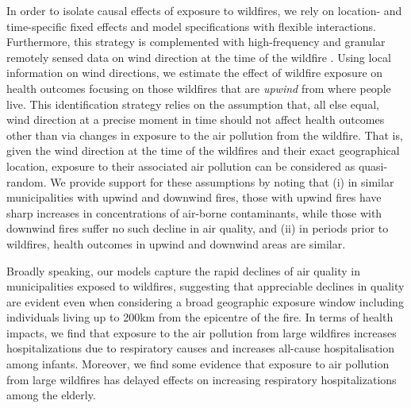 \documentclass[11pt]{article}
\begin{document}
\begin{spacing}{1.5}
In order to isolate causal effects of exposure to wildfires, we rely on location- and time-specific fixed effects and model specifications with flexible interactions. Furthermore, this strategy is complemented with high-frequency and granular remotely sensed data on wind direction at the time of the wildfire \citep{RangelVogl2019}. Using local information on wind directions, we estimate the effect of wildfire exposure on health outcomes focusing on those wildfires that are \textit{upwind} from where people live.  This identification strategy relies on the assumption that, all else equal, wind direction at a precise moment in time should not affect health outcomes other than via changes in exposure to the air pollution from the wildfire. That is, given the wind direction at the time of the wildfires and their exact geographical location, exposure to their associated air pollution can be considered as quasi-random.  We provide support for these assumptions by noting that (i) in similar municipalities with upwind and downwind fires, those  with upwind fires have sharp increases in concentrations of air-borne contaminants, while those with downwind fires suffer no such decline in air quality, and (ii) in periods prior to wildfires, health outcomes in upwind and downwind areas are similar.

Broadly speaking, our models capture the rapid declines of air quality in municipalities exposed to wildfires, suggesting that appreciable declines in quality are evident even when considering a broad geographic exposure window including individuals living up to 200km from the epicentre of the fire.  In terms of health impacts, we find that exposure to the air pollution from large wildfires increases hospitalizations due to respiratory causes and increases all-cause hospitalisation among infants. Moreover, we find some evidence that exposure to air pollution from large wildfires has delayed effects on increasing respiratory hospitalizations among the elderly.


\end{spacing}
\end{document}
